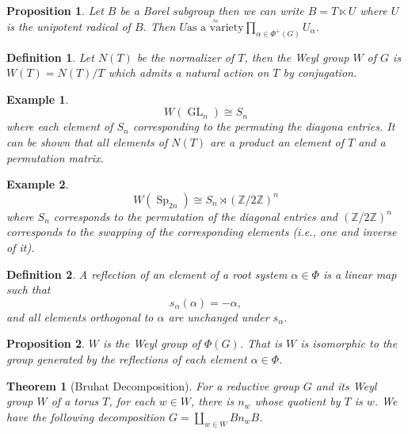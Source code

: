 \documentclass[10pt]{article}
\newtheorem{theorem}{Theorem} [section]
\newtheorem{proposition}{Proposition}[section]
\newtheorem{definition}{Definition}[section]
\newtheorem{example}{Example}[section]
\numberwithin{equation}{theorem}
\DeclareMathOperator{\GL}{GL}
\DeclareMathOperator{\Sp}{Sp}
\newcommand{\Z}[0]{\mathbb{Z}}
\begin{document}
\begin{proposition}
    Let $B$ be a Borel subgroup then we can write $B =T\ltimes U$ where $U$ is the unipotent radical of $B$. Then $U\stackrel{\simeq}{\text{as a variety}}\prod_{\alpha\in\Phi^+(G)}U_\alpha$.
\end{proposition}

\begin{definition}
    Let $N(T)$ be the normalizer of $T$, then the Weyl group $W$ of $G$ is $W(T) = N(T)/T$ which admits a natural action on $T$ by conjugation.
\end{definition}

\begin{example}
    \begin{equation*}
        W(\GL_n) \cong S_n
    \end{equation*}
    where each element of $S_n$ corresponding to the permuting the diagona entries. It can be shown that all elements of $N(T)$ are a product an element of $T$ and a permutation matrix.
\end{example}
\begin{example}
    \begin{equation*}
        W(\Sp_{2n})\cong S_n\rtimes (\Z/2\Z)^n
    \end{equation*}
    where $S_n$ corresponds to the permutation of the diagonal entries and $(\Z/2\Z)^n$ corresponds to the swapping of the corresponding elements (i.e., one and inverse of it). 
\end{example}

\begin{definition}
    A reflection of an element of a root system $\alpha\in\Phi$ is a linear map such that 
    \begin{equation*}
        s_\alpha(\alpha) = -\alpha,
    \end{equation*}
    and all elements orthogonal to $\alpha$ are unchanged under $s_\alpha$.
\end{definition}

\begin{proposition}
    $W$ is the Weyl group of $\Phi(G)$. That is $W$ is isomorphic to the group generated by the reflections of each element $\alpha\in\Phi$. 
\end{proposition}

\begin{theorem}[Bruhat Decomposition]
    For a reductive group $G$ and its Weyl group $W$ of a torus $T$, for each $w\in W$, there is $n_w$ whose quotient by $T$ is $w$. We have the following decomposition $G=\coprod_{w\in W}Bn_wB$.
\end{theorem}
\end{document}
